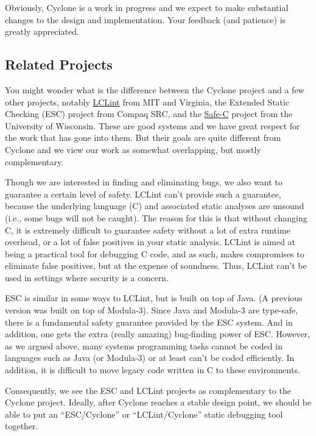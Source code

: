 Obviously, Cyclone is a work in progress and we expect to make
substantial changes to the design and implementation.  Your feedback
(and patience) is greatly appreciated.

\subsection{Related Projects}

You might wonder what is the difference between the Cyclone project
and a few other projects, notably
\href{http://lclint.cs.virginia.edu/}{LCLint} from MIT and Virginia,
the Extended Static Checking (ESC) project from Compaq SRC, and the
\href{http://www.cs.wisc.edu/~austin/scc.html}{Safe-C} project from
the University of Wisconsin.  These are good systems and we have great
respect for the work that has gone into them.  But their goals are
quite different from Cyclone and we view our work as somewhat
overlapping, but mostly complementary.

Though we are interested in finding and eliminating bugs, we also want
to guarantee a certain level of safety. LCLint can't provide such a
guarantee, because the underlying language (C) and associated static
analyses are unsound (i.e., some bugs will not be caught). The reason
for this is that without changing C, it is extremely difficult to
guarantee safety without a lot of extra runtime overhead, or a lot of
false positives in your static analysis. LCLint is aimed at being a
practical tool for debugging C code, and as such, makes compromises to
eliminate false positives, but at the expense of soundness. Thus,
LCLint can't be used in settings where security is a concern.

ESC is similar in some ways to LCLint, but is built on top of Java. (A
previous version was built on top of Modula-3). Since Java and
Modula-3 are type-safe, there is a fundamental safety guarantee
provided by the ESC system. And in addition, one gets the extra
(really amazing) bug-finding power of ESC\@. However, as we argued
above, many systems programming tasks cannot be coded in languages
such as Java (or Modula-3) or at least can't be coded efficiently. In
addition, it is difficult to move legacy code written in C to these
environments.

Consequently, we see the ESC and LCLint projects as complementary to
the Cyclone project. Ideally, after Cyclone reaches a stable design
point, we should be able to put an ``ESC/Cyclone'' or
``LCLint/Cyclone'' static debugging tool together.

